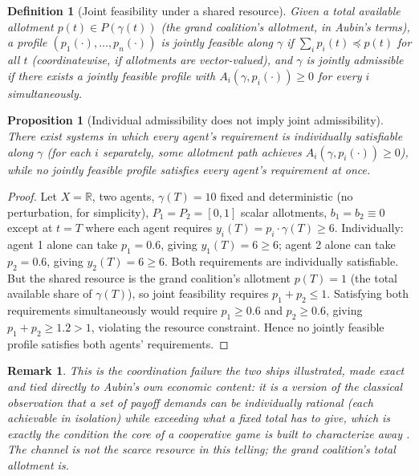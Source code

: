 \documentclass[11pt]{report}
\newtheorem{proposition}{Proposition}[chapter]
\newtheorem{definition}{Definition}[chapter]
\newtheorem{remark}{Remark}[chapter]
\begin{document}
\begin{definition}[Joint feasibility under a shared resource]
Given a total available allotment $p(t) \in P(\gamma(t))$ (the grand
coalition's allotment, in Aubin's terms), a profile
$(p_1(\cdot), \dots, p_n(\cdot))$ is jointly feasible along $\gamma$ if
$\sum_i p_i(t) \preceq p(t)$ for all $t$ (coordinatewise, if allotments
are vector-valued), and $\gamma$ is jointly admissible if there exists
a jointly feasible profile with $A_i(\gamma, p_i(\cdot)) \geq 0$ for
every $i$ simultaneously.
\end{definition}

\begin{proposition}[Individual admissibility does not imply joint admissibility]
There exist systems in which every agent's requirement is individually
satisfiable along $\gamma$ (for each $i$ separately, some allotment
path achieves $A_i(\gamma,p_i(\cdot)) \geq 0$), while no jointly
feasible profile satisfies every agent's requirement at once.
\end{proposition}
\begin{proof}
Let $X = \mathbb{R}$, two agents, $\gamma(T) = 10$ fixed and
deterministic (no perturbation, for simplicity), $P_1 = P_2 = [0,1]$
scalar allotments, $b_1 = b_2 \equiv 0$ except at $t = T$ where each
agent requires $y_i(T) = p_i \cdot \gamma(T) \geq 6$. Individually:
agent 1 alone can take $p_1 = 0.6$, giving $y_1(T) = 6 \geq 6$; agent 2
alone can take $p_2 = 0.6$, giving $y_2(T) = 6 \geq 6$. Both
requirements are individually satisfiable. But the shared resource is
the grand coalition's allotment $p(T) = 1$ (the total available share
of $\gamma(T)$), so joint feasibility requires $p_1 + p_2 \leq 1$.
Satisfying both requirements simultaneously would require
$p_1 \geq 0.6$ and $p_2 \geq 0.6$, giving $p_1 + p_2 \geq 1.2 > 1$,
violating the resource constraint. Hence no jointly feasible profile
satisfies both agents' requirements.
\end{proof}

\begin{remark}
This is the coordination failure the two ships illustrated, made exact
and tied directly to Aubin's own economic content: it is a version of
the classical observation that a set of payoff demands can be
individually rational (each achievable in isolation) while exceeding
what a fixed total has to give, which is exactly the condition the
core of a cooperative game is built to characterize away
\cite{aubin2001}. The channel is not the scarce resource in this
telling; the grand coalition's total allotment is.
\end{remark}
\end{document}
